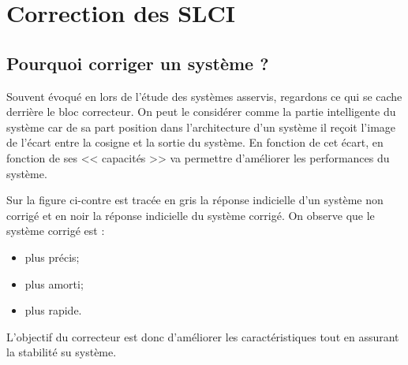\setchapterpreamble[u]{\margintoc}

\chapter{Correction des SLCI}




\section{Pourquoi corriger un système ?}



Souvent évoqué en lors de l'étude des systèmes asservis, regardons ce qui se cache derrière le bloc correcteur. On peut le considérer comme la partie intelligente du système car de sa part position dans l'architecture d'un système il reçoit l'image de l'écart entre la cosigne et la sortie du système. En fonction de cet écart, en fonction de ses << capacités >> va permettre d'améliorer les performances du système. 

Sur la figure ci-contre est tracée en gris la réponse indicielle d'un système non corrigé et en noir la réponse indicielle du système corrigé. On observe que le système corrigé est :
\begin{itemize}
\item plus précis;
\item plus amorti;
\item plus rapide. 
\end{itemize}
L'objectif du correcteur est donc d'améliorer les caractéristiques tout en assurant la stabilité su système.




